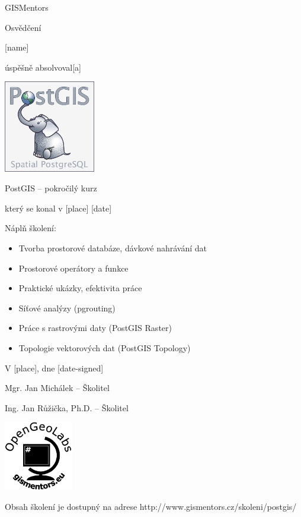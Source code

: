 \documentclass[12pt, a4paper]{letter}
\begin{document}
\pagestyle{empty}
\begin{center}

{\Large GISMentors}

{\Huge Osvědčení}

{\Large [name]}

úspěšně absolvoval[a]

\includegraphics[width=0.30\textwidth]{../images/postgis.png}

{\Large PostGIS -- pokročilý kurz}

který se konal v [place] [date]
\end{center}

Náplň školení:

\begin{itemize}
\item Tvorba prostorové databáze, dávkové nahrávání dat
\item Prostorové operátory a funkce
\item Praktické ukázky, efektivita práce
\item Síťové analýzy (pgrouting)
\item Práce s rastrovými daty (PostGIS Raster)
\item Topologie vektorových dat (PostGIS Topology)
\end{itemize}

\vfill
\parbox{7cm}{

    V [place], dne [date-signed]\\

\vfill

    Mgr. Jan Michálek -- Školitel\\

\vfill
    
    Ing. Jan Růžička, Ph.D. -- Školitel

}
\hfill
\parbox{3cm}{
    \includegraphics[width=3cm]{../images/placka.eps}
}


\begin{center}
{\footnotesize Obsah školení je dostupný na adrese
http://www.gismentors.cz/skoleni/postgis/}
\end{center}
\end{document}
